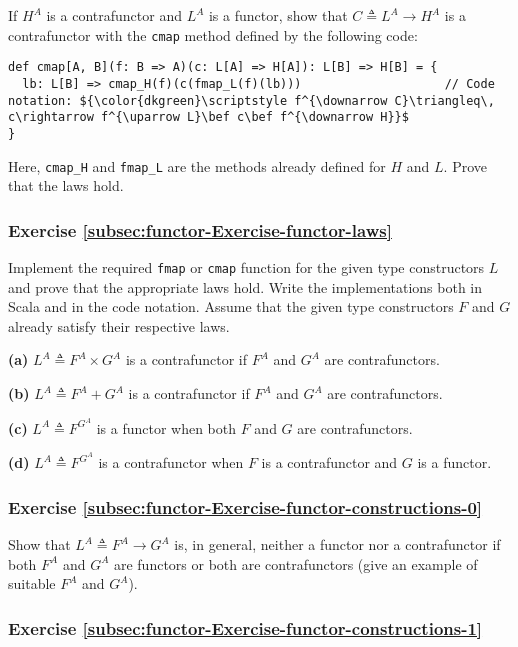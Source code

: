 If $H^{A}$ is a contrafunctor and $L^{A}$ is a functor, show that
$C\triangleq L^{A}\rightarrow H^{A}$ is a contrafunctor with the
\lstinline!cmap! method defined by the following code:
\begin{lstlisting}[mathescape=true]
def cmap[A, B](f: B => A)(c: L[A] => H[A]): L[B] => H[B] = {
  lb: L[B] => cmap_H(f)(c(fmap_L(f)(lb)))                    // Code notation: ${\color{dkgreen}\scriptstyle f^{\downarrow C}\triangleq\, c\rightarrow f^{\uparrow L}\bef c\bef f^{\downarrow H}}$
}
\end{lstlisting}
Here, \lstinline!cmap_H! and \lstinline!fmap_L! are the methods
already defined for $H$ and $L$. Prove that the laws hold.

\subsubsection{Exercise \label{subsec:functor-Exercise-functor-laws}\ref{subsec:functor-Exercise-functor-laws}}

Implement the required \lstinline!fmap! or \lstinline!cmap! function
for the given type constructors $L$ and prove that the appropriate
laws hold. Write the implementations both in Scala and in the code
notation. Assume that the given type constructors $F$ and $G$ already
satisfy their respective laws.

\textbf{(a)} $L^{A}\triangleq F^{A}\times G^{A}$ is a contrafunctor
if $F^{A}$ and $G^{A}$ are contrafunctors.

\textbf{(b)} $L^{A}\triangleq F^{A}+G^{A}$ is a contrafunctor if
$F^{A}$ and $G^{A}$ are contrafunctors.

\textbf{(c)} $L^{A}\triangleq F^{G^{A}}$ is a functor when both $F$
and $G$ are contrafunctors.

\textbf{(d)} $L^{A}\triangleq F^{G^{A}}$ is a contrafunctor when
$F$ is a contrafunctor and $G$ is a functor.

\subsubsection{Exercise \label{subsec:functor-Exercise-functor-constructions-0}\ref{subsec:functor-Exercise-functor-constructions-0}}

Show that $L^{A}\triangleq F^{A}\rightarrow G^{A}$ is, in general,
neither a functor nor a contrafunctor if both $F^{A}$ and $G^{A}$
are functors or both are contrafunctors (give an example of suitable
$F^{A}$ and $G^{A}$).

\subsubsection{Exercise \label{subsec:functor-Exercise-functor-constructions-1}\ref{subsec:functor-Exercise-functor-constructions-1}}

